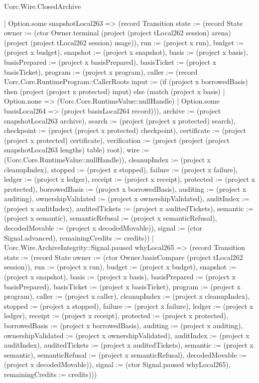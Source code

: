 \begin{lexlean}{Uorc.Wire.ClosedArchive}
\begin{semanticmodule}
{        | Option.some snapshotLocal263 => (record Transition {state := (record State {owner := (ctor Owner.terminal (project (project tLocal262 session) arena) (project (project tLocal262 session) usage)), run := (project x run), budget := (project x budget), snapshot := (project x snapshot), basis := (project x basis), basisPrepared := (project x basisPrepared), basisTicket := (project x basisTicket), program := (project x program), caller := (record Uorc.Core.RuntimeProgram::CallerRoots {input := (if (project x borrowedBasis) then (project (project x protected) input) else (match (project x basis)
          | Option.none => (Uorc.Core.RuntimeValue::nullHandle)
          | Option.some basisLocal264 => (project basisLocal264 record))), archive := (project snapshotLocal263 archive), search := (project (project x protected) search), checkpoint := (project (project x protected) checkpoint), certificate := (project (project x protected) certificate), verification := (project (project (project snapshotLocal263 lengths) table) root), wire := (Uorc.Core.RuntimeValue::nullHandle)}), cleanupIndex := (project x cleanupIndex), stopped := (project x stopped), failure := (project x failure), ledger := (project x ledger), receipt := (project x receipt), protected := (project x protected), borrowedBasis := (project x borrowedBasis), auditing := (project x auditing), ownershipValidated := (project x ownershipValidated), auditIndex := (project x auditIndex), auditedTickets := (project x auditedTickets), semantic := (project x semantic), semanticRefusal := (project x semanticRefusal), decodedMovable := (project x decodedMovable)}), signal := (ctor Signal.advanced), remainingCredits := credits}))
      | Uorc.Wire.ArchiveIntegrity::Signal.paused whyLocal265 => (record Transition {state := (record State {owner := (ctor Owner.basisCompare (project tLocal262 session)), run := (project x run), budget := (project x budget), snapshot := (project x snapshot), basis := (project x basis), basisPrepared := (project x basisPrepared), basisTicket := (project x basisTicket), program := (project x program), caller := (project x caller), cleanupIndex := (project x cleanupIndex), stopped := (project x stopped), failure := (project x failure), ledger := (project x ledger), receipt := (project x receipt), protected := (project x protected), borrowedBasis := (project x borrowedBasis), auditing := (project x auditing), ownershipValidated := (project x ownershipValidated), auditIndex := (project x auditIndex), auditedTickets := (project x auditedTickets), semantic := (project x semantic), semanticRefusal := (project x semanticRefusal), decodedMovable := (project x decodedMovable)}), signal := (ctor Signal.paused whyLocal265), remainingCredits := credits})))
}
\end{semanticmodule}
\end{lexlean}
